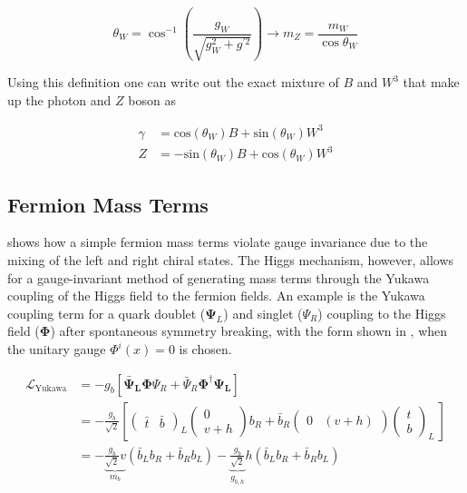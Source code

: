 \begin{equation}
\theta_W = \cos^{-1}\left( \frac{g_{W}}{\sqrt{g_{W}^{2}+g^{'2}}} \right) \rightarrow m_{Z} =
\frac{m_{W}}{\cos{\theta_{W}}}
\end{equation}

Using this definition one can write out the exact mixture of $B$ and $W^{3}$ that
make up the photon and $Z$ boson as

\begin{align}
\gamma &= \text{cos}(\theta_{W})B + \text{sin}(\theta_{W})W^{3} \\
Z &= -\text{sin}(\theta_{W})B + \text{cos}(\theta_{W})W^{3}
\end{align}

\subsection{Fermion Mass Terms} \label{sec:theory:fermion_mass}

 shows how a simple fermion mass terms violate gauge
invariance due to the mixing of the left and right chiral states.  The Higgs
mechanism, however, allows for a gauge-invariant method of generating mass
terms through the Yukawa coupling of the Higgs field to the fermion fields.  An
example is the Yukawa coupling term for a quark doublet
($\boldsymbol{\Psi}_{L}$) and singlet ($\Psi_R$) coupling to the Higgs field
($\boldsymbol{\Phi}$) after spontaneous symmetry breaking, with the form
shown in , when the unitary gauge $\Phi^{i}(x) = 0$
is chosen.

\begin{align}
\mathcal{L}_{\text{Yukawa}} &= - g_{b} \left[ \boldsymbol{\bar{\Psi}_L}
\boldsymbol{\Phi} \Psi_R + \bar{\Psi}_{R} \boldsymbol{\Phi}^{\dagger} \boldsymbol{\Psi_L}
\right] \\ &= - \frac{g_{b}}{\sqrt{2}} \left[ \left( \begin{matrix}
\bar{t} & \bar{b} \end{matrix} \right)_L \left( \begin{matrix} 0 \\ v +
h \end{matrix} \right) b_{R} + \bar{b}_{R} \left( \begin{matrix} 0 & (v + h)
\end{matrix} \right) \left( \begin{matrix} t \\ b \end{matrix} \right)_L \ \right] \\ &= - \underbrace{\frac{g_{b}}{\sqrt{2}}
v}_{m_{b}} \left( \bar{b}_{L}b_{R} + \bar{b}_{R}b_{L}  \right)
- \underbrace{\frac{g_{b}}{\sqrt{2}}}_{g_{b,h}} h \left(
\bar{b}_{L}b_{R} + \bar{b}_{R}b_{L}  \right) 
\end{align}

